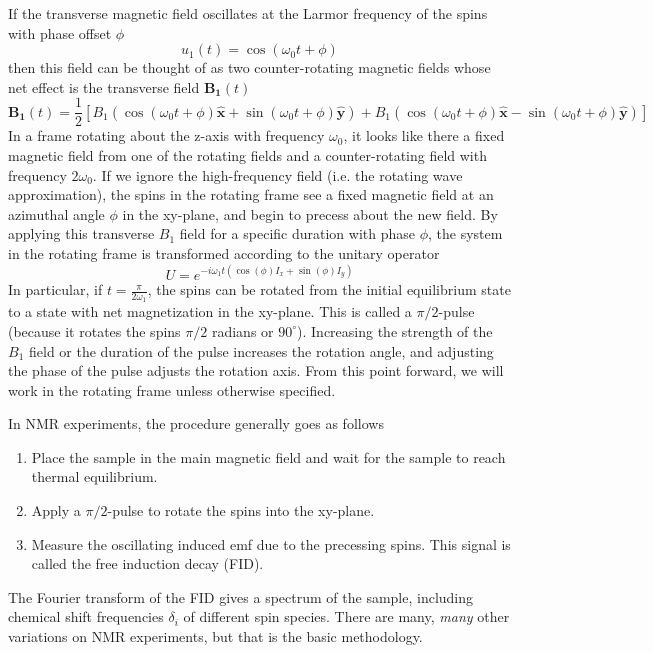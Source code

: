 If the transverse magnetic field oscillates at the Larmor frequency of the spins with phase offset $\phi$
\[
u_1(t) = \cos(\omega_0 t + \phi)
\]
then this field can be thought of as two counter-rotating magnetic fields whose net effect is the transverse field $\mathbf{B_1}(t)$
\[
\mathbf{B_1}(t) = \frac{1}{2} \left[
    B_1 (\cos(\omega_0 t + \phi) \mathbf{\hat{x}} + \sin(\omega_0 t + \phi) \mathbf{\hat{y}}) +
    B_1 (\cos(\omega_0 t + \phi) \mathbf{\hat{x}} - \sin(\omega_0 t + \phi) \mathbf{\hat{y}})
\right]
\]
%
%
In a frame rotating about the z-axis with frequency $\omega_0$, it looks like there a fixed magnetic field from one of the rotating fields and a counter-rotating field with frequency $2\omega_0$. If we ignore the high-frequency field (i.e. the rotating wave approximation), the spins in the rotating frame see a fixed magnetic field at an azimuthal angle $\phi$ in the xy-plane, and begin to precess about the new field.
By applying this transverse $B_1$ field for a specific duration with phase $\phi$, the system in the rotating frame is transformed according to the unitary operator
\[
U = e^{-i \omega_1 t (\cos(\phi) I_x + \sin(\phi) I_y)}
\]
In particular, if $t = \frac{\pi}{2 \omega_1}$, the spins can be rotated from the initial equilibrium state to a state with net magnetization in the xy-plane. This is called a $\pi/2$-pulse (because it rotates the spins $\pi/2$ radians or $90^\circ$). Increasing the strength of the $B_1$ field or the duration of the pulse increases the rotation angle, and adjusting the phase of the pulse adjusts the rotation axis.
From this point forward, we will work in the rotating frame unless otherwise specified.

In NMR experiments, the procedure generally goes as follows
\begin{enumerate}
    \item Place the sample in the main magnetic field and wait for the sample to reach thermal equilibrium.
    \item Apply a $\pi/2$-pulse to rotate the spins into the xy-plane.
    \item Measure the oscillating induced emf due to the precessing spins. This signal is called the free induction decay (FID).
\end{enumerate}
The Fourier transform of the FID gives a spectrum of the sample, including chemical shift frequencies $\delta_i$ of different spin species. There are many, \emph{many} other variations on NMR experiments, but that is the basic methodology.

